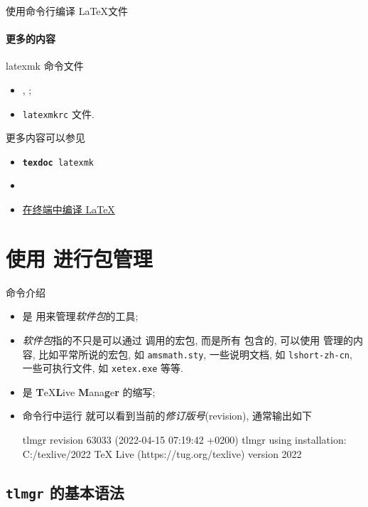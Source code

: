 \begin{frame}{使用命令行编译 \LaTeX 文件}
  \framesubtitle{更多的内容}
  latexmk 命令文件
  \begin{itemize}
    \item {}, ;
    \item \texttt{latexmkrc} 文件.
  \end{itemize}
  
  更多内容可以参见
  \begin{itemize}
    \item \texttt{\textbf{texdoc} latexmk}
    \item {}
    \item \href{https://syvshc.github.io/2022-03-06-latex-terminal-compiling/}{在终端中编译 \LaTeX}
  \end{itemize}
\end{frame}

\section{使用 \tlmgr 进行包管理}

\begin{frame}[fragile]{\tlmgr 命令介绍}
\begin{itemize}
  \item \tlmgr 是 \texlive 用来管理\emph{软件包}的工具;
  \item \emph{软件包}指的不只是可以通过 \lcmd{\usepackage} 调用的宏包, 而是所有 \texlive 包含的, 可以使用 \tlmgr 管理的内容, 比如平常所说的宏包, 如 \lstinline{amsmath.sty}, 一些说明文档, 如 \lstinline{lshort-zh-cn}, 一些可执行文件, 如 \lstinline{xetex.exe} 等等.
  \item \tlmgr 是 \textbf{T}eX\textbf{L}ive \textbf{M}ana\textbf{g}e\textbf{r} 的缩写;
  \item 命令行中运行  就可以看到当前的\emph{修订版号}(revision), 通常输出如下
\begin{outputcode}
tlmgr revision 63033 (2022-04-15 07:19:42 +0200)
tlmgr using installation: C:/texlive/2022
TeX Live (https://tug.org/texlive) version 2022
\end{outputcode}
\end{itemize}
\end{frame}

\subsection{\texttt{tlmgr} 的基本语法}

